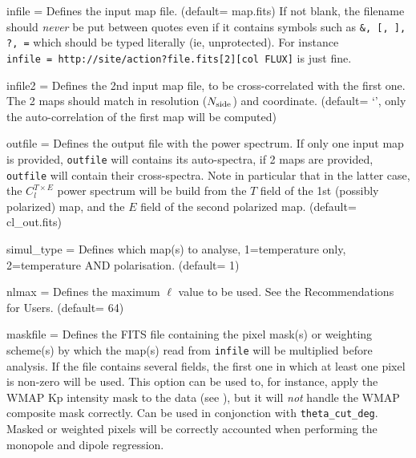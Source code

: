 \begin{qualifiers}
  \begin{qulist}{} %
    \item[{infile = }]%
 Defines the input map file. 
	(default= map.fits)
	If not blank, the filename should {\em never} be put between quotes even if it contains
symbols such as {\tt \&, [, ], ?, =} which should be typed literally (ie, unprotected). For instance
 {\tt infile~=~http://site/action?file.fits[2][col FLUX]} is just fine.
    \item[{infile2 = }]%
 Defines the 2nd input map file, to be cross-correlated with
	the first one. The 2 maps should match in resolution ($N_{\mathrm{side}}$) and coordinate.
	(default= `', only the auto-correlation of the first map will be computed)
    \item[{outfile = }]%
 Defines the output file with the power spectrum. If only
      one input map is provided, {\tt outfile} will contains its auto-spectra,
      if 2 maps are provided, {\tt outfile} will contain their
      cross-spectra. Note in particular that in the latter case, the $C^{T\times E}_l$ power
      spectrum will be build from the $T$ field of the 1st (possibly polarized) map, and the $E$
      field of the second polarized map.
(default= cl\_out.fits)
     \item[{simul\_type = }]%
 Defines which map(s) to analyse, 1=temperature only, 2=temperature AND polarisation.
(default= 1)
     \item[{nlmax = }]%
 Defines the maximum $\ell$ value 
to be used. See the Recommendations for Users. 
(default= 64)
 \item[{maskfile = }]%
 Defines the FITS file containing the pixel mask(s) or
 weighting scheme(s) by which the map(s) read from {\tt infile} will be
 multiplied before analysis. If the file contains several fields, the first
one in which at least one pixel is non-zero will be used. This option can be
 used to, for instance, apply
the WMAP Kp intensity mask to the data (see
), but it will {\em not} handle the WMAP composite mask correctly.
Can be used in conjonction with {\tt theta\_cut\_deg}. Masked or weighted pixels
 will be correctly accounted when performing the monopole and dipole regression.\\

\end{qulist}
\end{qualifiers}
